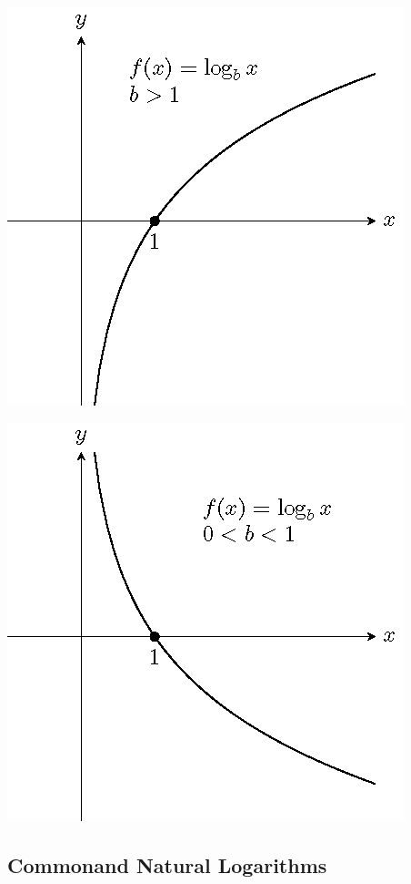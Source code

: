 \begin{multicols*}{2}
  \includegraphics[scale=0.8]{figs/tikz-example-log-function-graph-1.png}

\columnbreak

  \includegraphics[scale=0.8]{figs/tikz-example-log-function-graph-2.png}
\end{multicols*}


\subsection{Commonand Natural
Logarithms}

